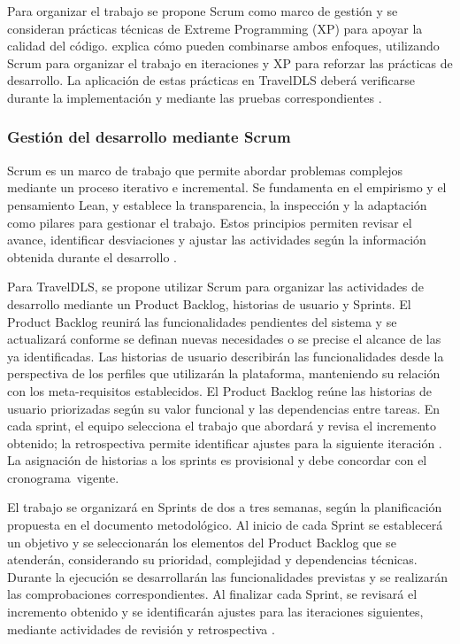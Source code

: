 Para organizar el trabajo se propone Scrum como marco de gestión y se consideran prácticas técnicas de Extreme Programming (XP) para apoyar la calidad del código. \textcite{bahit2012scrum} explica cómo pueden combinarse ambos enfoques, utilizando Scrum para organizar el trabajo en iteraciones y XP para reforzar las prácticas de desarrollo. La aplicación de estas prácticas en TravelDLS deberá verificarse durante la implementación y mediante las pruebas correspondientes \parencite{beck2000xp, bahit2012scrum, schwaber2020scrum}.

\subsubsection{Gestión del desarrollo mediante Scrum}

Scrum es un marco de trabajo que permite abordar problemas complejos mediante un proceso iterativo e incremental. Se fundamenta en el empirismo y el pensamiento Lean, y establece la transparencia, la inspección y la adaptación como pilares para gestionar el trabajo. Estos principios permiten revisar el avance, identificar desviaciones y ajustar las actividades según la información obtenida durante el desarrollo \parencite{schwaber2020scrum}.

Para TravelDLS, se propone utilizar Scrum para organizar las actividades de desarrollo mediante un Product Backlog, historias de usuario y Sprints. El Product Backlog reunirá las funcionalidades pendientes del sistema y se actualizará conforme se definan nuevas necesidades o se precise el alcance de las ya identificadas. Las historias de usuario describirán las funcionalidades desde la perspectiva de los perfiles que utilizarán la plataforma, manteniendo su relación con los meta-requisitos establecidos. El Product Backlog reúne las historias de usuario priorizadas según su valor funcional y las dependencias entre tareas. En cada sprint, el equipo selecciona el trabajo que abordará y revisa el incremento obtenido; la retrospectiva permite identificar ajustes para la siguiente iteración \parencite{bahit2012scrum, schwaber2020scrum}. La asignación de historias a los sprints es provisional y debe concordar con el \mbox{cronograma vigente}.

El trabajo se organizará en Sprints de dos a tres semanas, según la planificación propuesta en el documento metodológico. Al inicio de cada Sprint se establecerá un objetivo y se seleccionarán los elementos del Product Backlog que se atenderán, considerando su prioridad, complejidad y dependencias técnicas. Durante la ejecución se desarrollarán las funcionalidades previstas y se realizarán las comprobaciones correspondientes. Al finalizar cada Sprint, se revisará el incremento obtenido y se identificarán ajustes para las iteraciones siguientes, mediante actividades de revisión y retrospectiva \parencite{schwaber2020scrum}.

